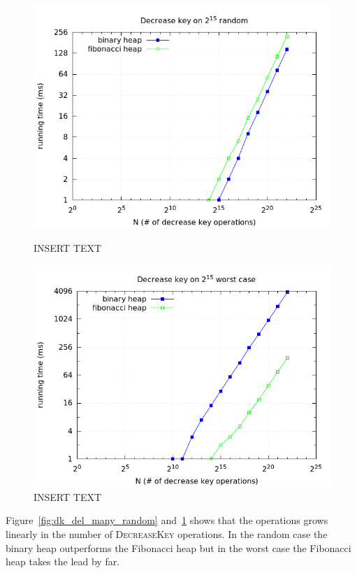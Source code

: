 \documentclass[a4paper,oneside,article,11pt]{memoir}
\begin{document}
\begin{figure}[H]
\centering
\begin{minipage}{0.48\columnwidth}
  \centering
  \includegraphics[width=\linewidth]{../res/dk/dk_random_fixed_size.png}%
  \caption{INSERT TEXT}
  \label{fig:dk_del_many_random}
\end{minipage}%
\hfill
\begin{minipage}{0.48\columnwidth}
  \centering
  \includegraphics[width=\linewidth]{../res/dk/dk_worst_fixed_size.png}%
  \caption{INSERT TEXT}
  \label{fig:dk_del_many_worst}
\end{minipage}
\end{figure}

Figure~\ref{fig:dk_del_many_random} and~\ref{fig:dk_del_many_worst} shows that the operations grows linearly in the number of \textsc{DecreaseKey} operations. In the random case the binary heap outperforms the Fibonacci heap but in the worst case the Fibonacci heap takes the lead by far.
\end{document}
